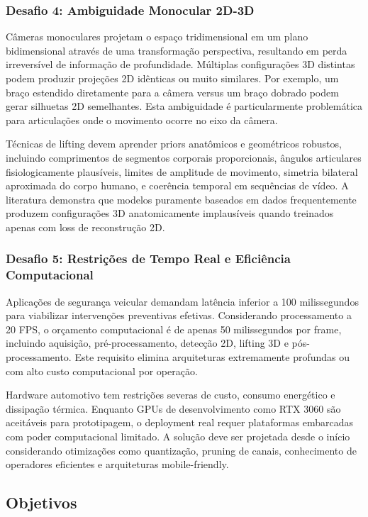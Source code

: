 \documentclass[12pt, a4paper]{article}
\begin{document}
\subsubsection{Desafio 4: Ambiguidade Monocular 2D-3D}

Câmeras monoculares projetam o espaço tridimensional em um plano bidimensional através de uma transformação perspectiva, resultando em perda irreversível de informação de profundidade. Múltiplas configurações 3D distintas podem produzir projeções 2D idênticas ou muito similares. Por exemplo, um braço estendido diretamente para a câmera versus um braço dobrado podem gerar silhuetas 2D semelhantes. Esta ambiguidade é particularmente problemática para articulações onde o movimento ocorre no eixo da câmera.

Técnicas de lifting devem aprender priors anatômicos e geométricos robustos, incluindo comprimentos de segmentos corporais proporcionais, ângulos articulares fisiologicamente plausíveis, limites de amplitude de movimento, simetria bilateral aproximada do corpo humano, e coerência temporal em sequências de vídeo. A literatura demonstra que modelos puramente baseados em dados frequentemente produzem configurações 3D anatomicamente implausíveis quando treinados apenas com loss de reconstrução 2D.

\subsubsection{Desafio 5: Restrições de Tempo Real e Eficiência Computacional}

Aplicações de segurança veicular demandam latência inferior a 100 milissegundos para viabilizar intervenções preventivas efetivas. Considerando processamento a 20 FPS, o orçamento computacional é de apenas 50 milissegundos por frame, incluindo aquisição, pré-processamento, detecção 2D, lifting 3D e pós-processamento. Este requisito elimina arquiteturas extremamente profundas ou com alto custo computacional por operação.

Hardware automotivo tem restrições severas de custo, consumo energético e dissipação térmica. Enquanto GPUs de desenvolvimento como RTX 3060 são aceitáveis para prototipagem, o deployment real requer plataformas embarcadas com poder computacional limitado. A solução deve ser projetada desde o início considerando otimizações como quantização, pruning de canais, conhecimento de operadores eficientes e arquiteturas mobile-friendly.

\subsection{Objetivos}
\end{document}
